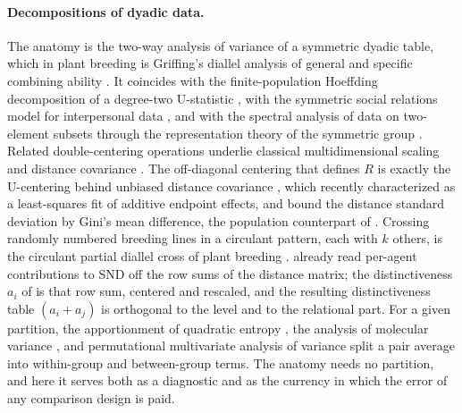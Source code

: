 \paragraph{Decompositions of dyadic data.}
The anatomy is the two-way analysis of variance of a symmetric dyadic table,
which in plant breeding is Griffing's diallel analysis of general and specific
combining ability \citep{griffing1956concept}. It coincides with the
finite-population Hoeffding decomposition of a degree-two U-statistic
\citep{nandi1963properties,bloznelis2001orthogonal}, with the symmetric social relations model for
interpersonal data \citep{kenny1984social}, and with the spectral analysis of
data on two-element subsets through the representation theory of the symmetric
group \citep{james1978representation,diaconis1988group}. Related double-centering
operations underlie classical multidimensional scaling
\citep{torgerson1952multidimensional,gower1966some} and distance covariance
\citep{szekely2007measuring}. The off-diagonal centering that defines $R$ is
exactly the U-centering behind unbiased distance covariance
\citep{szekely2014partial,lyons2013distance}, which
\citet{zhang2026ucentering} recently characterized as a least-squares fit of
additive endpoint effects, and \citet{edelmann2020distance} bound the
distance standard deviation by Gini's mean difference, the population
counterpart of . Crossing randomly numbered breeding lines in a circulant pattern, each with $k$
others, is the circulant partial diallel cross of plant breeding
\citep{kempthorne1961partial}. \citet{bettini2025snd} already read per-agent contributions to SND off the
row sums of the distance matrix; the distinctiveness $a_i$ of 
is that row sum, centered and rescaled, and the resulting distinctiveness table
$(a_i+a_j)$ is orthogonal to the level and to the relational part. For a given
partition, the apportionment of quadratic entropy \citep{rao1982diversity}, the
analysis of molecular variance \citep[AMOVA;][]{excoffier1992analysis}, and
permutational multivariate analysis of variance \citep[PERMANOVA;][]{anderson2001new} split a pair average into within-group and
between-group terms. The anatomy needs no partition, and here it serves both
as a diagnostic and as the currency in which the error of any comparison
design is paid.

